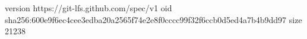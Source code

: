 version https://git-lfs.github.com/spec/v1
oid sha256:600e9f6ec4cee3edba20a2565f74e2e8f0cccc99f32f6ccb0d5ed4a7b4b9dd97
size 21238
